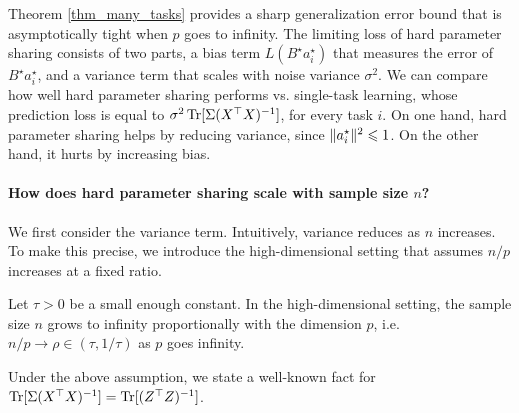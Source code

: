 Theorem \ref{thm_many_tasks} provides a sharp generalization error bound that is asymptotically tight when $p$ goes to infinity.
The limiting loss of hard parameter sharing consists of two parts, a bias term $L(B^{\star} a_i^{\star})$ that measures the error of $B^{\star} a_i^{\star}$, and a variance term that scales with noise variance $\sigma^2$.
We can compare how well hard parameter sharing performs vs. single-task learning, whose prediction loss is equal to $\sigma^2 \operatorname{Tr}[\Sigma (X^{\top} X)^{-1}]$, for every task $i$.
On one hand, hard parameter sharing helps by reducing variance, since $\|a_i^{\star}\|^2 \leqslant 1$.
On the other hand, it hurts by increasing bias.


\paragraph{How does hard parameter sharing scale with sample size $n$?}
We first consider the variance term.
Intuitively, variance reduces as $n$ increases.
To make this precise, we introduce the high-dimensional setting that assumes $n / p$ increases at a fixed ratio.
\begin{assumption}\label{assume_rm}
	Let $\tau > 0$ be a small enough constant.
	In the high-dimensional setting,
  the sample size $n$ grows to infinity proportionally with the dimension $p$, i.e. $n / p \rightarrow \rho \in (\tau, 1/\tau)$ as $p$ goes infinity.
\end{assumption}
Under the above assumption, we state a well-known fact for $\operatorname{Tr}[\Sigma (X^{\top} X)^{-1}] = \operatorname{Tr}[(Z^{\top} Z)^{-1}]$.

